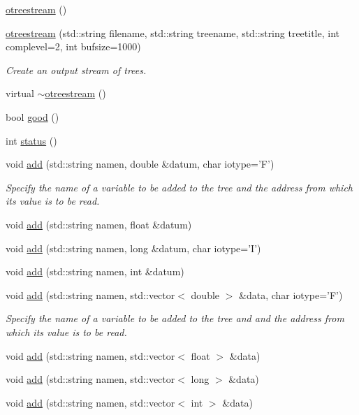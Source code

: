 \begin{CompactItemize}
\item 
\hyperlink{classotreestream_a0}{otreestream} ()
\item 
\hyperlink{classotreestream_a1}{otreestream} (std::string filename, std::string treename, std::string treetitle, int complevel=2, int bufsize=1000)
\begin{CompactList}\small\item\em Create an output stream of trees. \item\end{CompactList}\item 
virtual \hyperlink{classotreestream_a2}{$\sim$otreestream} ()
\item 
bool \hyperlink{classotreestream_a3}{good} ()
\item 
int \hyperlink{classotreestream_a4}{status} ()
\item 
void \hyperlink{classotreestream_a5}{add} (std::string namen, double \&datum, char iotype='F')
\begin{CompactList}\small\item\em Specify the name of a variable to be added to the tree and the address from which its value is to be read. \item\end{CompactList}\item 
void \hyperlink{classotreestream_a6}{add} (std::string namen, float \&datum)
\item 
void \hyperlink{classotreestream_a7}{add} (std::string namen, long \&datum, char iotype='I')
\item 
void \hyperlink{classotreestream_a8}{add} (std::string namen, int \&datum)
\item 
void \hyperlink{classotreestream_a9}{add} (std::string namen, std::vector$<$ double $>$ \&data, char iotype='F')
\begin{CompactList}\small\item\em Specify the name of a variable to be added to the tree and and the address from which its value is to be read. \item\end{CompactList}\item 
void \hyperlink{classotreestream_a10}{add} (std::string namen, std::vector$<$ float $>$ \&data)
\item 
void \hyperlink{classotreestream_a11}{add} (std::string namen, std::vector$<$ long $>$ \&data)
\item 
void \hyperlink{classotreestream_a12}{add} (std::string namen, std::vector$<$ int $>$ \&data)

\end{CompactItemize}
